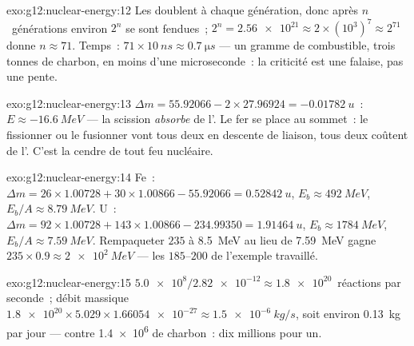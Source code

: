 \begin{solution}{exo:g12:nuclear-energy:12}
Les  doublent à chaque génération, donc après
$n$~générations environ $2^n$ se sont fendues~; $2^{n} = \num{2.56e21}
\approx 2 \times (10^{3})^{7} \approx 2^{71}$ donne $n \approx 71$.
Temps~: $71 \times \qty{10}{ns} \approx \qty{0.7}{\micro s}$ --- un
gramme de combustible, trois tonnes de charbon, en moins d'une
microseconde~: la criticité est une falaise, pas une pente.
\end{solution}

\begin{solution}{exo:g12:nuclear-energy:13}
$\Delta m = 55.92066 - 2 \times 27.96924 = \qty{-0.01782}{u}$~:
$E \approx \qty{-16.6}{MeV}$ --- la scission \emph{absorbe} de
l'. Le fer se place au sommet~: le
fissionner ou le fusionner vont tous deux en descente de liaison,
tous deux coûtent de l'. C'est la cendre
de tout feu nucléaire.
\end{solution}

\begin{solution}{exo:g12:nuclear-energy:14}
Fe~: $\Delta m = 26 \times 1.00728 + 30 \times 1.00866 - 55.92066 =
\qty{0.52842}{u}$, $E_b \approx \qty{492}{MeV}$, $E_b/A \approx
\qty{8.79}{MeV}$. U~: $\Delta m = 92 \times 1.00728 + 143 \times
1.00866 - 234.99350 = \qty{1.91464}{u}$, $E_b \approx \qty{1784}{MeV}$,
$E_b/A \approx \qty{7.59}{MeV}$. Rempaqueter $235$
 à \qty{8.5}{MeV} au lieu de
\qty{7.59}{MeV} gagne $235 \times 0.9 \approx \qty{2e2}{MeV}$ --- les
$185$--$200$ de l'exemple travaillé.
\end{solution}

\begin{solution}{exo:g12:nuclear-energy:15}
$\num{5.0e8}/\num{2.82e-12} \approx \num{1.8e20}$~réactions par
seconde~; débit massique $\num{1.8e20} \times 5.029 \times
\num{1.66054e-27} \approx \qty{1.5e-6}{kg/s}$, soit environ
\qty{0.13}{kg} par jour --- contre \num{1.4e6}
 de charbon~: dix millions pour un.
\end{solution}


